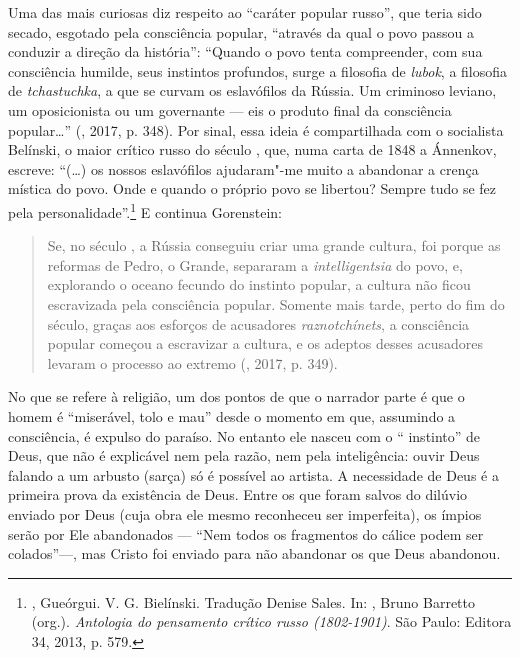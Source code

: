 Uma das mais curiosas diz respeito ao ``caráter popular russo'', que
teria sido secado, esgotado pela consciência popular, ``através da qual
o povo passou a conduzir a direção da história'': ``Quando o povo tenta compreender,
com sua consciência humilde, seus instintos profundos,
surge a filosofia de \emph{lubok}, a filosofia de \emph{tchastuchka}, a que
se curvam os eslavófilos da Rússia. Um criminoso leviano,
um oposicionista ou um governante --- eis o produto final da consciência
popular\ldots{}'' (, 2017, p. 348). Por sinal, essa ideia 
é compartilhada com o socialista Belínski, o maior crítico russo 
do século , que, numa carta de 1848 a Ánnenkov, 
escreve: ``(\ldots{}) os nossos eslavófilos ajudaram"-me muito a abandonar a
 crença mística do povo. Onde e quando o próprio povo se libertou?
 Sempre tudo se fez pela personalidade''.\footnote{, Gueórgui. V. G. Bielínski. Tradução Denise Sales. In: , Bruno Barretto (org.). \emph{Antologia do pensamento crítico russo (1802-1901)}. São Paulo: Editora 34, 2013, p. 579.} E continua Gorenstein:

\begin{quotation}
Se, no século , a Rússia conseguiu criar uma grande
cultura, foi porque as reformas de Pedro, o Grande, separaram a
\emph{intelligentsia} do povo, e, explorando o oceano fecundo do instinto
popular, a cultura não ficou escravizada pela consciência popular. Somente
mais tarde, perto do fim do século, graças aos esforços de
acusadores \emph{raznotchínets}, a consciência popular começou a escravizar a
cultura, e os adeptos desses acusadores levaram o processo ao extremo
(, 2017, p. 349).
\end{quotation}

No que se refere à religião, um dos pontos de que o narrador parte é que
o homem é ``miserável, tolo e mau'' desde o momento em que, assumindo a
consciência, é expulso do paraíso. No entanto ele nasceu com o ``
instinto'' de Deus, que não é explicável nem pela razão, nem pela
inteligência: ouvir Deus falando a um arbusto (sarça) só é possível ao artista.
A necessidade de Deus é a primeira prova da existência de Deus. Entre os
que foram salvos do dilúvio enviado por Deus (cuja obra ele mesmo
reconheceu ser imperfeita), os ímpios serão por Ele abandonados ---
``Nem todos os fragmentos do cálice podem ser colados''---, mas Cristo
foi enviado para não abandonar os que Deus abandonou.

